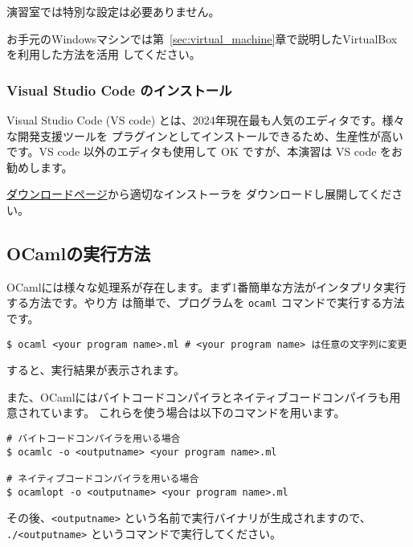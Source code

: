 \documentclass[a4paper,11pt]{jsarticle}
\begin{document}
演習室では特別な設定は必要ありません。

お手元のWindowsマシンでは第~\ref{sec:virtual_machine}章で説明したVirtualBox を利用した方法を活用
してください。

\subsubsection{Visual Studio Code のインストール}

Visual Studio Code (VS code) とは、2024年現在最も人気のエディタです。様々な開発支援ツールを
プラグインとしてインストールできるため、生産性が高いです。VS code 以外のエディタも使用して
OK ですが、本演習は VS code をお勧めします。

\href{https://code.visualstudio.com/download}{ダウンロードページ}から適切なインストーラを
ダウンロードし展開してください。

\subsection{OCamlの実行方法}

OCamlには様々な処理系が存在します。まず1番簡単な方法がインタプリタ実行する方法です。やり方
は簡単で、プログラムを \verb|ocaml| コマンドで実行する方法です。

\begin{lstlisting}
$ ocaml <your program name>.ml # <your program name> は任意の文字列に変更
\end{lstlisting}

すると、実行結果が表示されます。

また、OCamlにはバイトコードコンパイラとネイティブコードコンパイラも用意されています。
これらを使う場合は以下のコマンドを用います。

\begin{lstlisting}
# バイトコードコンパイラを用いる場合
$ ocamlc -o <outputname> <your program name>.ml

# ネイティブコードコンパイラを用いる場合
$ ocamlopt -o <outputname> <your program name>.ml
\end{lstlisting}

その後、\verb|<outputname>| という名前で実行バイナリが生成されますので、
\verb|./<outputname>| というコマンドで実行してください。


\end{document}
